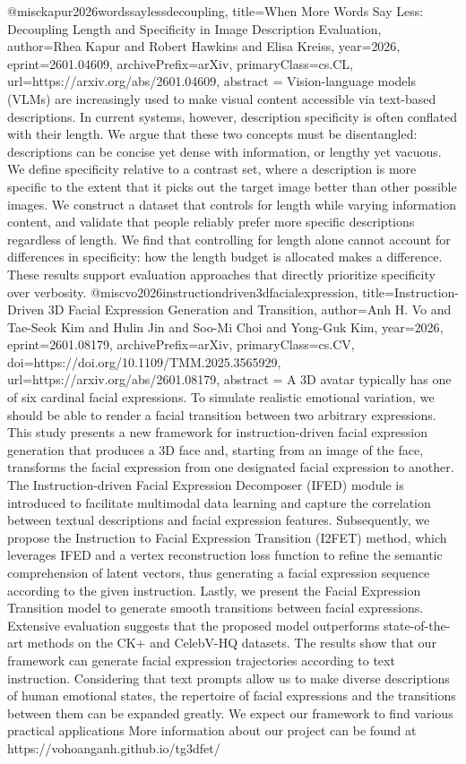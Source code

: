 {}@misc{kapur2026wordssaylessdecoupling,
      title={When More Words Say Less: Decoupling Length and Specificity in Image Description Evaluation}, 
      author={Rhea Kapur and Robert Hawkins and Elisa Kreiss},
      year={2026},
      eprint={2601.04609},
      archivePrefix={arXiv},
      primaryClass={cs.CL},
      url={https://arxiv.org/abs/2601.04609},
      abstract = {Vision-language models (VLMs) are increasingly used to make visual content accessible via text-based descriptions. In current systems, however, description specificity is often conflated with their length. We argue that these two concepts must be disentangled: descriptions can be concise yet dense with information, or lengthy yet vacuous. We define specificity relative to a contrast set, where a description is more specific to the extent that it picks out the target image better than other possible images. We construct a dataset that controls for length while varying information content, and validate that people reliably prefer more specific descriptions regardless of length. We find that controlling for length alone cannot account for differences in specificity: how the length budget is allocated makes a difference. These results support evaluation approaches that directly prioritize specificity over verbosity.}
}@misc{vo2026instructiondriven3dfacialexpression,
      title={Instruction-Driven 3D Facial Expression Generation and Transition}, 
      author={Anh H. Vo and Tae-Seok Kim and Hulin Jin and Soo-Mi Choi and Yong-Guk Kim},
      year={2026},
      eprint={2601.08179},
      archivePrefix={arXiv},
      primaryClass={cs.CV},
      doi={https://doi.org/10.1109/TMM.2025.3565929},
      url={https://arxiv.org/abs/2601.08179},
      abstract = {A 3D avatar typically has one of six cardinal facial expressions. To simulate realistic emotional variation, we should be able to render a facial transition between two arbitrary expressions. This study presents a new framework for instruction-driven facial expression generation that produces a 3D face and, starting from an image of the face, transforms the facial expression from one designated facial expression to another. The Instruction-driven Facial Expression Decomposer (IFED) module is introduced to facilitate multimodal data learning and capture the correlation between textual descriptions and facial expression features. Subsequently, we propose the Instruction to Facial Expression Transition (I2FET) method, which leverages IFED and a vertex reconstruction loss function to refine the semantic comprehension of latent vectors, thus generating a facial expression sequence according to the given instruction. Lastly, we present the Facial Expression Transition model to generate smooth transitions between facial expressions. Extensive evaluation suggests that the proposed model outperforms state-of-the-art methods on the CK+ and CelebV-HQ datasets. The results show that our framework can generate facial expression trajectories according to text instruction. Considering that text prompts allow us to make diverse descriptions of human emotional states, the repertoire of facial expressions and the transitions between them can be expanded greatly. We expect our framework to find various practical applications More information about our project can be found at https://vohoanganh.github.io/tg3dfet/}
}
